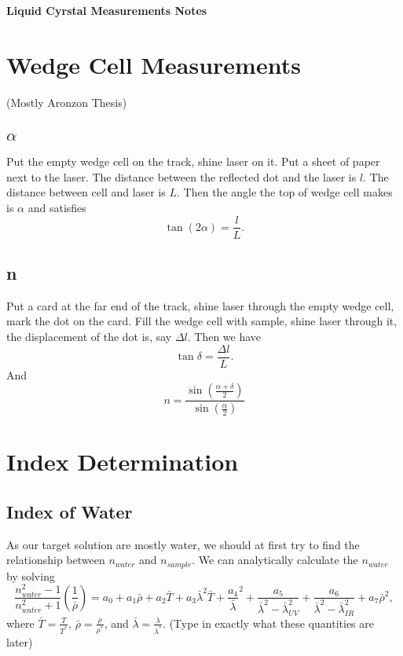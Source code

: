 \documentclass[11pt]{article}
\newcommand{\mytitlecompact}[1]{{

\hfill
{\Large \sffamily \bfseries{#1}}
\hfill
}}
\newcommand{\expectation}[1]{\langle #1\rangle}
\begin{document}

\mytitlecompact{Liquid Cyrstal Measurements Notes}
\section*{Wedge Cell Measurements}
(Mostly Aronzon Thesis)

\subsection*{$\alpha$}
Put the empty wedge cell on the track, shine laser on it. Put a sheet of paper next to the laser. The distance between the reflected dot and
the laser is $l$. The distance between cell and laser is $L$. Then the angle the top of wedge cell makes is $\alpha$ and satisfies
\begin{equation}
    \tan(2\alpha) = \frac{l}{L}.
\end{equation}
\subsection*{n}
Put a card at the far end of the track, shine laser through the empty wedge cell, mark the dot on the card. Fill the wedge cell with sample, shine laser
through it, the displacement of the dot is, say $\Delta l$. Then we have 
\begin{equation}
    \tan{\delta} = \frac{\Delta l}{L}. 
\end{equation}
And \begin{equation}
    \boxed{n = \frac{\sin{(\frac{\alpha+\delta}{2})}}{\sin{(\frac{\alpha}{2})}}}
\end{equation}
\section*{Index Determination}
\subsection*{Index of Water}
As our target solution are mostly water, we should at first try to find the relationship 
between $n_{water}$ and $n_{sample}$. We can analytically calculate the $n_{water}$ by solving
\begin{equation}
    \frac{n_{water}^2-1}{n_{water}^2+1} (\frac{1}{\bar{\rho}})= a_0+a_1\bar{\rho}+a_2\bar{T}+a_3\bar{\lambda}^2\bar{T}
    +\frac{a_4}{\bar{\lambda}}^2+\frac{a_5}{\bar{\lambda}^2-\bar{\lambda}_{UV}^2}+\frac{a_6}{\bar{\lambda}^2-\bar{\lambda}_{IR}^2}+
a_7 \bar{\rho}^2,
    \label{Index Of Refraction for Water}
\end{equation}
where $\bar{T} = \frac{T}{T^*}$, $\bar{\rho} = \frac{\rho}{\rho^*}$, and $\bar{\lambda} = \frac{\lambda}{\lambda^*}$. (Type in exactly what these quantities are later)
\end{document}
